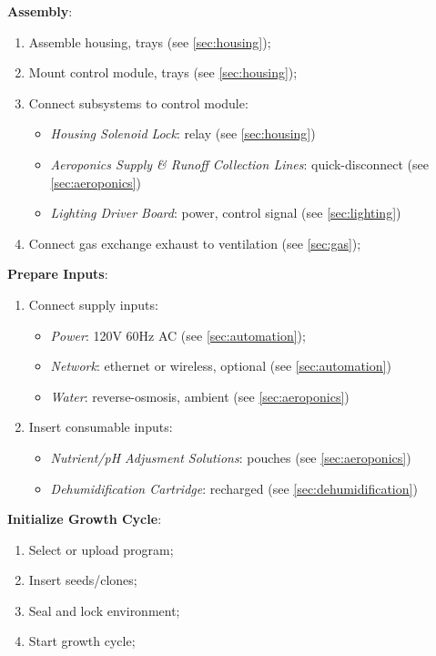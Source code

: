 \textbf{Assembly}:
\begin{enumerate}
    \item Assemble housing, trays (see \ref{sec:housing});
    \item Mount control module, trays (see \ref{sec:housing});
    \item Connect subsystems to control module:
    \begin{itemize}
        \item \textit{Housing Solenoid Lock}: relay (see \ref{sec:housing})
        \item \textit{Aeroponics Supply \& Runoff Collection Lines}: quick-disconnect (see \ref{sec:aeroponics})
        \item \textit{Lighting Driver Board}: power, control signal (see \ref{sec:lighting})
    \end{itemize}
    \item Connect gas exchange exhaust to ventilation (see \ref{sec:gas});
\end{enumerate}

\textbf{Prepare Inputs}:
\begin{enumerate}
    \item Connect supply inputs:
    \begin{itemize}
        \item \textit{Power}: 120V 60Hz AC (see \ref{sec:automation});
        \item \textit{Network}: ethernet or wireless, optional (see \ref{sec:automation})
        \item \textit{Water}: reverse-osmosis, ambient (see \ref{sec:aeroponics})
    \end{itemize}
    \item Insert consumable inputs:
    \begin{itemize}
        \item \textit{Nutrient/pH Adjusment Solutions}: pouches (see \ref{sec:aeroponics})
        \item \textit{Dehumidification Cartridge}: recharged (see \ref{sec:dehumidification})
    \end{itemize}
\end{enumerate}

\textbf{Initialize Growth Cycle}:
\begin{enumerate}
    \item Select or upload program;
    \item Insert seeds/clones;
    \item Seal and lock environment;
    \item Start growth cycle;
\end{enumerate}

